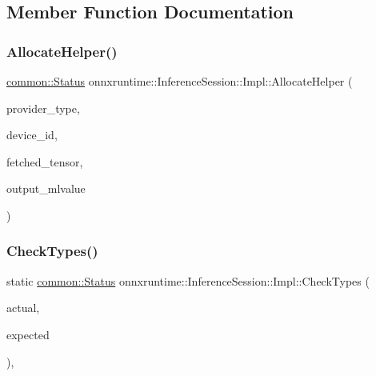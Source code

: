 \subsection{Member Function Documentation}
\mbox{\label{classonnxruntime_1_1InferenceSession_1_1Impl_ac9f294a90e67e3838589669752a772dd}} 
\subsubsection{\texorpdfstring{Allocate\+Helper()}{AllocateHelper()}}
{\footnotesize\ttfamily \mbox{\hyperlink{classonnxruntime_1_1common_1_1Status}{common\+::\+Status}} onnxruntime\+::\+Inference\+Session\+::\+Impl\+::\+Allocate\+Helper (\begin{DoxyParamCaption}\item[{\mbox{\hyperlink{namespaceonnxruntime_a863e2227cbf32aab76aad35fdadff4bb}{onnxruntime\+::\+Provider\+Type}}}]{provider\+\_\+type,  }\item[{int}]{device\+\_\+id,  }\item[{const \mbox{\hyperlink{classonnxruntime_1_1Tensor}{Tensor}} \&}]{fetched\+\_\+tensor,  }\item[{\mbox{\hyperlink{classonnxruntime_1_1MLValue}{M\+L\+Value}} \&}]{output\+\_\+mlvalue }\end{DoxyParamCaption})\hspace{0.3cm}{\ttfamily [inline]}}

\mbox{\label{classonnxruntime_1_1InferenceSession_1_1Impl_a1ac8cdb4798aecb427ccfaf41511d8f6}} 
\subsubsection{\texorpdfstring{Check\+Types()}{CheckTypes()}}
{\footnotesize\ttfamily static \mbox{\hyperlink{classonnxruntime_1_1common_1_1Status}{common\+::\+Status}} onnxruntime\+::\+Inference\+Session\+::\+Impl\+::\+Check\+Types (\begin{DoxyParamCaption}\item[{\mbox{\hyperlink{namespaceonnxruntime_ad77d0a6e838ec7da5dc35fed5ee66b49}{M\+L\+Data\+Type}}}]{actual,  }\item[{\mbox{\hyperlink{namespaceonnxruntime_ad77d0a6e838ec7da5dc35fed5ee66b49}{M\+L\+Data\+Type}}}]{expected }\end{DoxyParamCaption})\hspace{0.3cm}{\ttfamily [inline]}, {\ttfamily [static]}}

